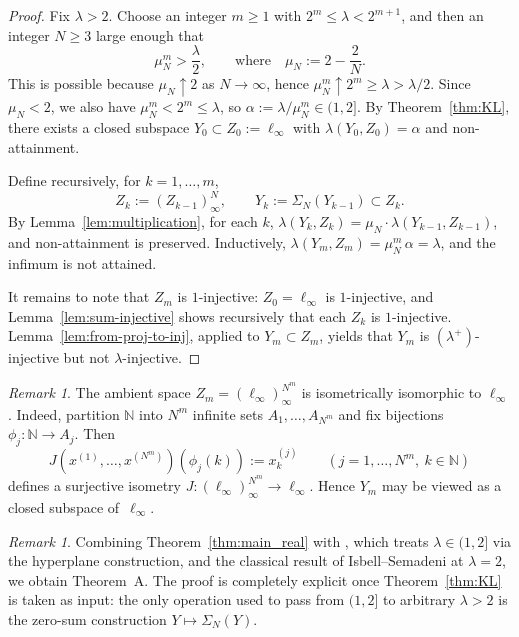 \documentclass[11pt]{amsart}
\renewcommand{\le}{\leqslant}
\renewcommand{\ge}{\geqslant}
\theoremstyle{definition}
\theoremstyle{remark}
\newtheorem{remark}[theorem]{Remark}
\theoremstyle{plain}
\numberwithin{equation}{section}
\newcommand{\N}{\mathbb{N}}
\begin{document}
\begin{proof}
Fix $\lambda>2$.  Choose an integer $m\ge 1$ with
$2^m\le\lambda<2^{m+1}$, and then an integer $N\ge 3$ large enough that
\[
\mu_N^m>\frac{\lambda}{2},
\qquad\text{where}\quad \mu_N:=2-\frac{2}{N}.
\]
This is possible because $\mu_N\uparrow 2$ as $N\to\infty$, hence
$\mu_N^m\uparrow 2^m\ge\lambda>\lambda/2$.  Since $\mu_N<2$, we also
have $\mu_N^m<2^m\le\lambda$, so
$\alpha:=\lambda/\mu_N^m\in(1,2]$.
By Theorem~\ref{thm:KL}, there exists a closed subspace
$Y_0\subset Z_0:=\ell_\infty$ with $\lambda(Y_0,Z_0)=\alpha$ and
non-attainment.

Define recursively, for $k=1,\dots,m$,
\[
Z_k:=(Z_{k-1})_\infty^N,\qquad
Y_k:=\Sigma_N(Y_{k-1})\subset Z_k.
\]
By Lemma~\ref{lem:multiplication}, for each $k$,
$\lambda(Y_k,Z_k)=\mu_N\cdot\lambda(Y_{k-1},Z_{k-1})$,
and non-attainment is preserved.  Inductively,
$\lambda(Y_m,Z_m)=\mu_N^m\,\alpha=\lambda$,
and the infimum is not attained.

It remains to note that $Z_m$ is $1$-injective: $Z_0=\ell_\infty$ is
$1$-injective, and Lemma~\ref{lem:sum-injective} shows recursively that
each $Z_k$ is $1$-injective.
Lemma~\ref{lem:from-proj-to-inj}, applied to $Y_m\subset Z_m$, yields
that $Y_m$ is $(\lambda^+)$-injective but not $\lambda$-injective.
\end{proof}

\begin{remark}\label{rem:ambient_linf}
The ambient space $Z_m=(\ell_\infty)_\infty^{N^m}$ is isometrically
isomorphic to $\ell_\infty$.  Indeed, partition $\N$ into $N^m$
infinite sets $A_1,\dots,A_{N^m}$ and fix bijections
$\phi_j\colon \N\to A_j$.  Then
\[
J(x^{(1)},\dots,x^{(N^m)})(\phi_j(k)):=x^{(j)}_k
\qquad (j=1,\dots,N^m,\ k\in\N)
\]
defines a surjective isometry
$J\colon (\ell_\infty)_\infty^{N^m}\to \ell_\infty$.
Hence $Y_m$ may be viewed as a closed subspace of~$\ell_\infty$.
\end{remark}

\begin{remark}\label{rem:thm_A_summary}
Combining Theorem~\ref{thm:main_real} with
\cite[Theorem~A]{KaniaLewicki}, which treats $\lambda\in(1,2]$ via
the hyperplane construction, and the classical result of
Isbell--Semadeni \cite{IsbellSemadeni} at $\lambda=2$, we obtain
Theorem~A.  The proof is completely explicit once
Theorem~\ref{thm:KL} is taken as input: the only operation used to
pass from $(1,2]$ to arbitrary $\lambda>2$ is the zero-sum
construction $Y\mapsto\Sigma_N(Y)$.
\end{remark}
\end{document}
